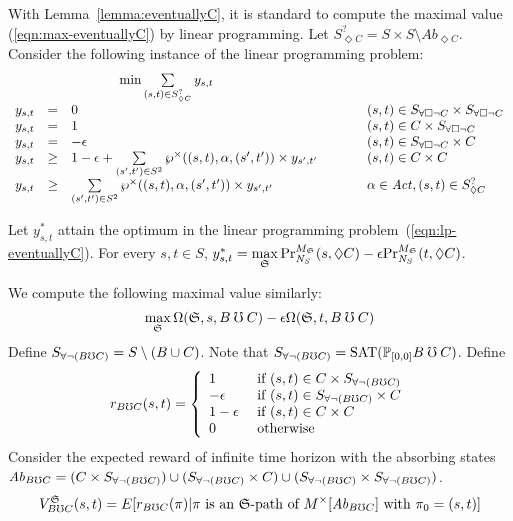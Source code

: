With Lemma~\ref{lemma:eventuallyC}, it is standard to compute 
the maximal value (\ref{eqn:max-eventuallyC}) by linear programming.
Let ${S}^{?}_{\Diamond C} = S \times S \setminus
\mathit{Ab}_{\Diamond C}$. Consider the following 
instance of the linear programming problem:
\begin{eqnarray}
  \label{eqn:lp-eventuallyC}
\begin{array}{rclll}
  \multicolumn{3}{c}{
  \min \sum\limits_{(s, t) \in {S}^{?}_{\Diamond C}} y_{s, t}
  }\\
  y_{s, t} & = & 0 & \hspace{.05\columnwidth} &
  (s, t) \in \neverC \times \neverC\\
  y_{s, t} & = & 1 & &
  (s, t) \in C \times \neverC\\
  y_{s, t} & = & - \epsilon & &
  (s, t) \in \neverC \times C\\
  y_{s, t} & \geq & 1 - \epsilon + 
  \sum\limits_{(s', t') \in S^2}
   \wp^{\times} ((s, t), \alpha, (s', t')) \times y_{s', t'} & &
  (s, t) \in C \times C\\
  y_{s, t} &\geq & \sum\limits_{(s', t') \in
  S^2}
   \wp^{\times} ((s, t), \alpha, (s', t')) \times y_{s', t'} 
  & &
  \alpha \in \Act, (s, t) \in {S}^{?}_{\Diamond C}
\end{array}
\end{eqnarray}

\begin{theorem}
  Let $y^*_{s, t}$ attain the optimum
  in the linear programming problem~(\ref{eqn:lp-eventuallyC}). For
  every $s, t \in S$,   
  $y^*_{s, t} = \max\limits_{\scheduler{S}}
  \myPr{s}{M_{\scheduler{S}}}{\neighbor{S}}{\gF C} - 
  \epsilon \myPr{t}{M_{\scheduler{S}}}{\neighbor{S}}{\gF C}$.  
  \label{theorem:eventuallyC}
\end{theorem}

We compute the following maximal value similarly:
\begin{eqnarray}
  \label{eqn:max-BuntilC}
  \max_{\scheduler{S}} 
  \pPr{\scheduler{S}}{s}{B \guntil C} -
  \epsilon \pPr{\scheduler{S}}{t}{B \guntil C}
\end{eqnarray}
Define $\neverBuntilC = S \setminus (B \cup C)$. Note that 
$\neverBuntilC = \textmd{SAT}(\PJ{[0,0]} B \guntil C)$.
Define
\[
r_{B \guntil C} (s, t) =
\left\{
  \begin{array}{ll}
    1 & \textmd{ if } (s, t) \in C \times \neverBuntilC\\
    -\epsilon & \textmd{ if } (s, t) \in \neverBuntilC \times C\\
    1 - \epsilon & \textmd{ if } (s, t) \in C \times C\\
    0 & \textmd{ otherwise}
  \end{array}
\right.
\]
Consider the expected reward of
infinite time horizon with the 
absorbing states $\mathit{Ab}_{B \guntil C} = (C \times
\neverBuntilC) \cup (\neverBuntilC \times C) \cup (\neverBuntilC \times
\neverBuntilC)$.
\[
V^{\scheduler{S}}_{B \guntil C}(s, t) = E[ r_{B \guntil C} (\pi) | \pi
\textmd{ is an $\scheduler{S}$-path of } 
{M}^{\times}[\mathit{Ab}_{B \guntil C}] \textmd{ with } \pi_0 = (s, t) ]
\]


